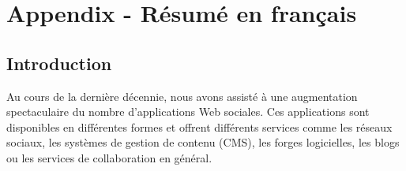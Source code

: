 \chapter*{Appendix - Résumé en français}

\section*{Introduction}
Au cours de la dernière décennie, nous avons assisté à une augmentation spectaculaire du nombre d'applications Web sociales. Ces applications sont disponibles en différentes formes et offrent différents services comme les réseaux sociaux, les systèmes de gestion de contenu (CMS), les forges logicielles, les blogs ou les services de collaboration en général.\\


